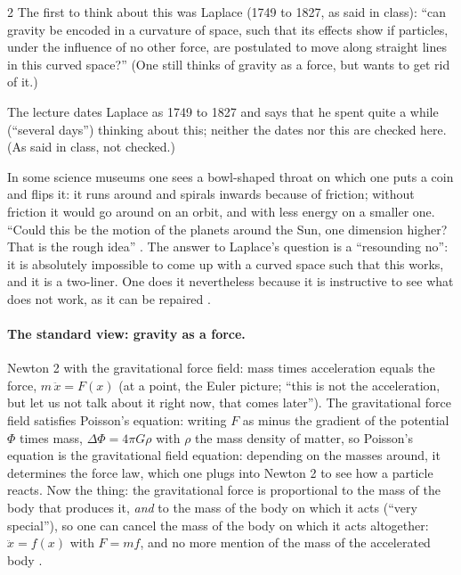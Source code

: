 \begin{paracol}{2}
The first to think about this was Laplace (1749 to 1827, as said in class): ``can gravity be encoded in a curvature of space, such that its effects show if particles, under the influence of no other force, are postulated to move along straight lines in this curved space?'' (One still thinks of gravity as a force, but wants to get rid of it.)
\begin{history}
The lecture dates Laplace as 1749 to 1827 and says that he spent quite a while (``several days'') thinking about this; neither the dates nor this are checked here. (As said in class, not checked.)
\end{history}
In some science museums one sees a bowl-shaped throat on which one puts a coin and flips it: it runs around and spirals inwards because of friction; without friction it would go around on an orbit, and with less energy on a smaller one. ``Could this be the motion of the planets around the Sun, one dimension higher? That is the rough idea''
.
The answer to Laplace's question is a ``resounding no'': it is absolutely impossible to come up with a curved space such that this works, and it is a two-liner. One does it nevertheless because it is instructive to see what does not work, as it can be repaired .

\paragraph{The standard view: gravity as a force.} Newton 2 with the gravitational force field: mass times acceleration equals the force, $m\,\ddot x=F(x)$ (at a point, the Euler picture; ``this is not the acceleration, but let us not talk about it right now, that comes later''). The gravitational force field satisfies Poisson's equation: writing $F$ as minus the gradient of the potential $\Phi$ times mass, $\Delta\Phi=4\pi G\rho$ with $\rho$ the mass density of matter, so Poisson's equation is the gravitational field equation: depending on the masses around, it determines the force law, which one plugs into Newton 2 to see how a particle reacts.
Now the thing: the gravitational force is proportional to the mass of the body that produces it, \emph{and} to the mass of the body on which it acts (``very special''), so one can cancel the mass of the body on which it acts altogether: $\ddot x=f(x)$ with $F=mf$, and no more mention of the mass of the accelerated body .


\end{paracol}
